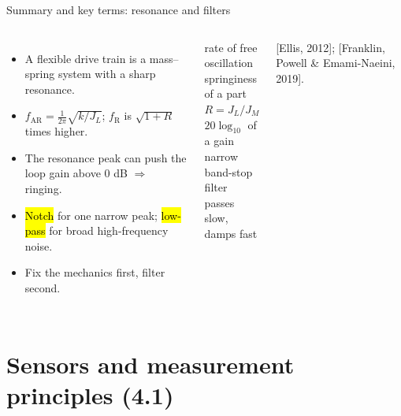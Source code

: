 \documentclass[aspectratio=169,10pt]{beamer}
\begin{document}
\begin{frame}{Summary and key terms: resonance and filters}
\begin{columns}[T]
\begin{itemize}\small
\item A flexible drive train is a mass--spring system with a sharp resonance.
\item $f_\text{AR}=\frac{1}{2\pi}\sqrt{k/J_L}$; $f_\text{R}$ is $\sqrt{1+R}$ times higher.
\item The resonance peak can push the loop gain above 0 dB $\Rightarrow$ ringing.
\item \hl{Notch} for one narrow peak; \hl{low-pass} for broad high-frequency noise.
\item Fix the mechanics first, filter second.
\end{itemize}
\begin{defbox}
\small
{} rate of free oscillation\\
 springiness of a part\\
 $R=J_L/J_M$\\
 $20\log_{10}$ of a gain\\
 narrow band-stop filter\\
 passes slow, damps fast
\end{defbox}
{\scriptsize\color{mkGray} [Ellis, 2012]; [Franklin, Powell \& Emami-Naeini, 2019].}
\end{columns}
\end{frame}

\section{Sensors and measurement principles (4.1)}
\end{document}
